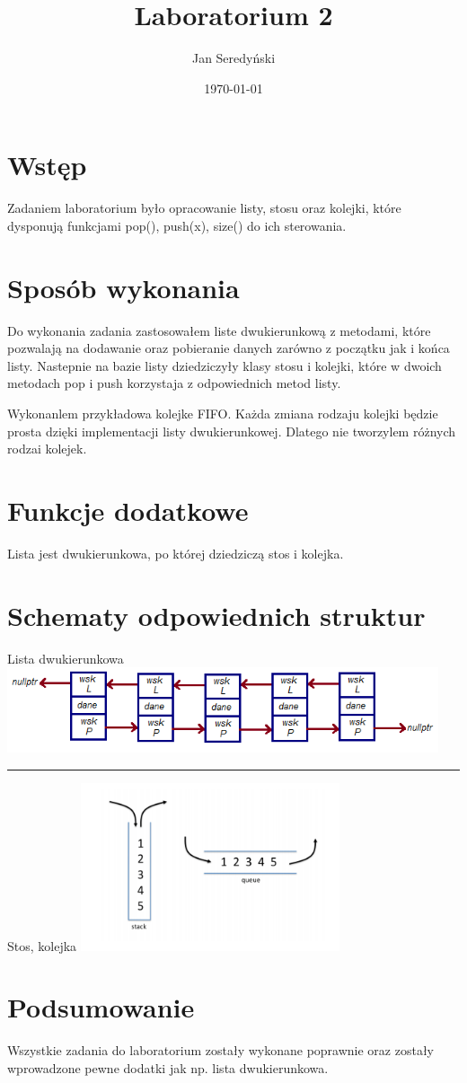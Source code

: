 \documentclass[11pt]{article}
\begin{document}
\title{Laboratorium 2}
\author{Jan Seredyński}
\date{\today}
\maketitle

\section{Wstęp}
Zadaniem laboratorium było opracowanie listy, stosu oraz kolejki, które dysponują funkcjami pop(), push(x), size() do ich sterowania.

\section{Sposób wykonania}
Do wykonania zadania zastosowałem liste dwukierunkową z metodami, które pozwalają na dodawanie oraz pobieranie danych zarówno z początku jak i końca listy. Nastepnie na bazie listy dziedziczyły klasy stosu i kolejki, które w dwoich metodach pop i push korzystaja z odpowiednich metod listy.

Wykonanlem przykładowa kolejke FIFO. Każda zmiana rodzaju kolejki będzie prosta dzięki implementacji listy dwukierunkowej. Dlatego nie tworzylem różnych rodzai kolejek.

\section{Funkcje dodatkowe}
Lista jest dwukierunkowa, po której dziedziczą stos i kolejka.

\section{Schematy odpowiednich struktur}

Lista dwukierunkowa
\includegraphics[width=5in]{lista2_1.png} 
\par\vspace{\baselineskip}
\hrule
\par\vspace{\baselineskip}
Stos, kolejka
\includegraphics[width=3in]{stackqueue.png} 



\section{Podsumowanie}
Wszystkie zadania do laboratorium zostały wykonane poprawnie oraz zostały wprowadzone pewne dodatki jak np. lista dwukierunkowa.
\end{document}
